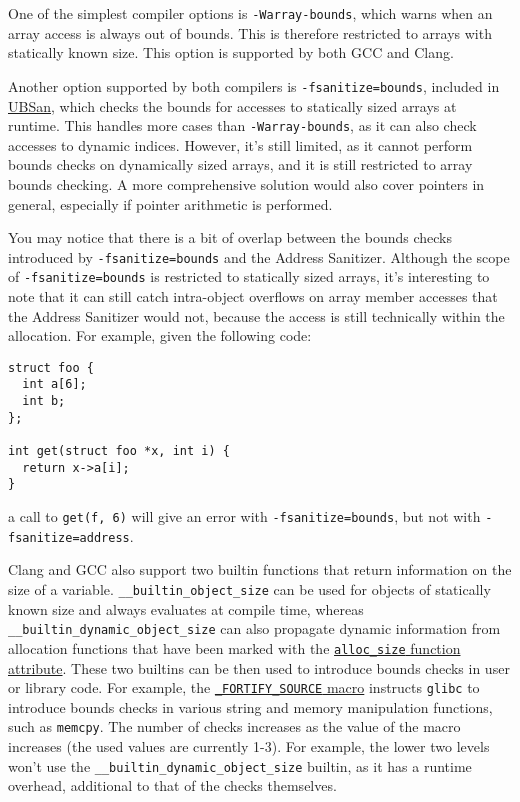 \documentclass[
  a4paper,
]{report}
\begin{document}
One of the simplest compiler options is \texttt{-Warray-bounds}, which
warns when an array access is always out of bounds. This is therefore
restricted to arrays with statically known size. This option is
supported by both GCC and Clang.

Another option supported by both compilers is
\texttt{-fsanitize=bounds}, included in \hyperref[sanitizers]{UBSan},
which checks the bounds for accesses to statically sized arrays at
runtime. This handles more cases than \texttt{-Warray-bounds}, as it can
also check accesses to dynamic indices. However, it's still limited, as
it cannot perform bounds checks on dynamically sized arrays, and it is
still restricted to array bounds checking. A more comprehensive solution
would also cover pointers in general, especially if pointer arithmetic
is performed.

You may notice that there is a bit of overlap between the bounds checks
introduced by \texttt{-fsanitize=bounds} and the Address Sanitizer.
Although the scope of \texttt{-fsanitize=bounds} is restricted to
statically sized arrays, it's interesting to note that it can still
catch \label{__index_entry_86}{intra-object
overflows} on array member accesses that
the Address Sanitizer would not, because the access is still technically
within the allocation. For example, given the following code:

\begin{verbatim}
struct foo {
  int a[6];
  int b;
};

int get(struct foo *x, int i) {
  return x->a[i];
}
\end{verbatim}

a call to \texttt{get(f,\ 6)} will give an error with
\texttt{-fsanitize=bounds}, but not with \texttt{-fsanitize=address}.

Clang and GCC also support two builtin functions that return information
on the size of a variable. \texttt{\_\_builtin\_object\_size} can be
used for objects of statically known size and always evaluates at
compile time, whereas \texttt{\_\_builtin\_dynamic\_object\_size} can
also propagate dynamic information from allocation functions that have
been marked with the
\href{https://gcc.gnu.org/onlinedocs/gcc-4.7.2/gcc/Function-Attributes.html}{\texttt{alloc\_size}
function attribute}. These two builtins can be then used to introduce
bounds checks in user or library code. For example, the
\href{https://man7.org/linux/man-pages/man7/feature_test_macros.7.html}{\texttt{\_FORTIFY\_SOURCE}
macro} instructs \texttt{glibc} to introduce bounds checks in various
string and memory manipulation functions, such as \texttt{memcpy}. The
number of checks increases as the value of the macro increases (the used
values are currently 1-3). For example, the lower two levels won't use
the \texttt{\_\_builtin\_dynamic\_object\_size} builtin, as it has a
runtime overhead, additional to that of the checks themselves.
\end{document}
